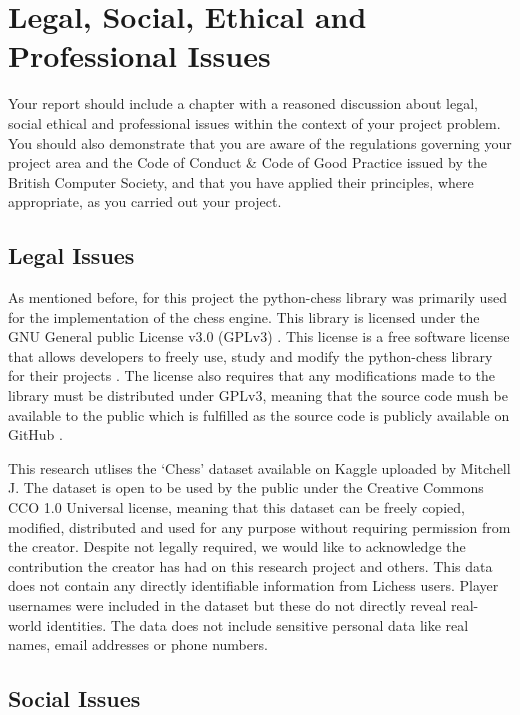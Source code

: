 \chapter{Legal, Social, Ethical and Professional Issues}
Your report should include a chapter with a reasoned discussion about legal, social ethical and professional issues within the context of your project problem. You should also demonstrate that you are aware of the regulations governing your project area and the Code of Conduct \& Code of Good Practice issued by the British Computer Society, and that you have applied their principles, where appropriate, as you carried out your project.

\section{Legal Issues}

As mentioned before, for this project the python-chess library was primarily used for the implementation of the chess engine. This library is licensed under the GNU General public License v3.0 (GPLv3) \cite{PythonchessPurePython}. This license is a free software license that allows developers to freely use, study and modify the python-chess library for their projects \cite{GNUGeneralPublic}. The license also requires that any modifications made to the library must be distributed under GPLv3, meaning that the source code mush be available to the public which is fulfilled as the source code is publicly available on GitHub \cite{fiekasNiklasfPythonchess2025}. 

This research utlises the `Chess' dataset available on Kaggle \cite{ChessGameDataset} uploaded by Mitchell J. The dataset is open to be used by the public under the Creative Commons CCO 1.0 Universal license, meaning that this dataset can be freely copied, modified, distributed and used for any purpose without requiring permission from the creator. Despite not legally required, we would like to acknowledge the contribution the creator has had on this research project and others. This data does not contain any directly identifiable information from Lichess users. Player usernames were included in the dataset but these do not directly reveal real-world identities. The data does not include sensitive personal data like real names, email addresses or phone numbers.

\section{Social Issues}

